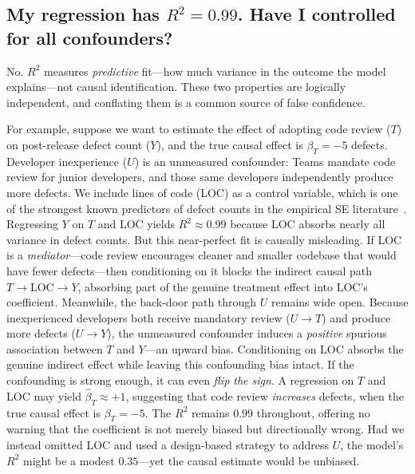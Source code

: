 \subsection{My regression has $R^2 = 0.99$. Have I controlled for all confounders?}

No.
$R^2$ measures \emph{predictive} fit---how much variance in the outcome the model explains---not causal identification.
These two properties are logically independent, and conflating them is a common source of false confidence.

For example, suppose we want to estimate the effect of adopting code review ($T$) on post-release defect count ($Y$), and the true causal effect is $\beta_T = -5$ defects.
Developer inexperience ($U$) is an unmeasured confounder: Teams mandate code review for junior developers, and those same developers independently produce more defects.
We include lines of code (LOC) as a control variable, which is one of the strongest known predictors of defect counts in the empirical SE literature~\cite{DBLP:journals/tse/GravesKMS00, DBLP:journals/tse/EmamBGR01, DBLP:books/oreilly/11/HerraizH11}.
Regressing $Y$ on $T$ and LOC yields $R^2 \approx 0.99$ because LOC absorbs nearly all variance in defect counts.
But this near-perfect fit is causally misleading.
If LOC is a \emph{mediator}---code review encourages cleaner and smaller codebase that would have fewer defects---then conditioning on it blocks the indirect causal path $T \to \text{LOC} \to Y$, absorbing part of the genuine treatment effect into LOC's coefficient.
Meanwhile, the back-door path through $U$ remains wide open.
Because inexperienced developers both receive mandatory review ($U \to T$) and produce more defects ($U \to Y$), the unmeasured confounder induces a \emph{positive} spurious association between $T$ and $Y$---an upward bias.
Conditioning on LOC absorbs the genuine indirect effect while leaving this confounding bias intact.
If the confounding is strong enough, it can even \emph{flip the sign}.
A regression on $T$ and LOC may yield $\hat{\beta}_T \approx +1$, suggesting that code review \emph{increases} defects, when the true causal effect is $\beta_T = -5$.
The $R^2$ remains $0.99$ throughout, offering no warning that the coefficient is not merely biased but directionally wrong.
Had we instead omitted LOC and used a design-based strategy to address $U$, the model's $R^2$ might be a modest $0.35$---yet the causal estimate would be unbiased.

